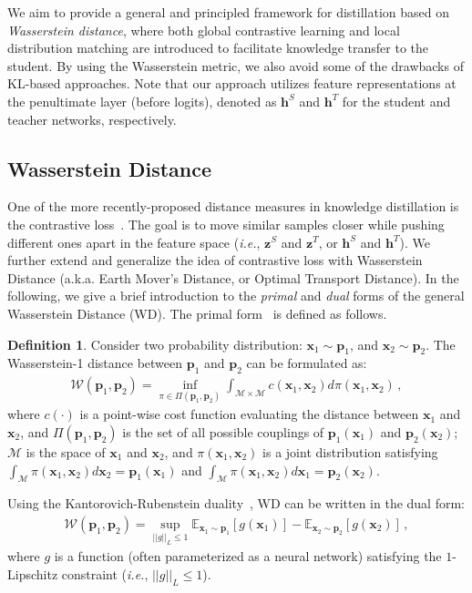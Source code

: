 \documentclass[final]{cvpr}
\newcommand{\hv}{{\boldsymbol h}}
\newcommand{\pv}{{\boldsymbol p}}
\newcommand{\xv}{{\boldsymbol x}}
\newcommand{\zv}{{\boldsymbol z}}
\newcommand{\Wcal}{\mathcal{W}}
\theoremstyle{definition}
\newtheorem{definition}{Definition}[section]
\begin{document}
We aim to provide a general and principled framework for distillation based on \emph{Wasserstein distance}, 
where both global contrastive learning and local distribution matching are introduced to facilitate  knowledge transfer to the student.
By using the Wasserstein metric, we also avoid some of the drawbacks of KL-based approaches.
Note that our approach utilizes feature representations at the penultimate layer (before logits), denoted as $\hv^S$ and $\hv^T$ for the student and teacher networks, respectively.


\subsection{Wasserstein Distance}\label{subsec:wasserstein_intro}



One of the more recently-proposed distance measures in knowledge distillation is the contrastive loss~\cite{tian2019contrastive}. The goal is to move similar samples closer while pushing different ones apart in the feature space (\emph{i.e.}, $\zv^S$ and $\zv^T$, or $\hv^S$ and $\hv^T$). We further extend and generalize the idea of contrastive loss with Wasserstein Distance (a.k.a. Earth Mover's Distance, or Optimal Transport Distance).
In the following, we give a brief introduction to the \emph{primal} and \emph{dual} forms of the general Wasserstein Distance (WD). 
The primal form~\cite{villani2008optimal} is defined as follows.
\begin{definition} \label{def:wd}
    Consider two probability distribution: $\xv_1\sim \pv_1$, and $\xv_2\sim \pv_2$.
The Wasserstein-1 distance between $\pv_1$ and $\pv_2$ can be formulated as:
\begin{align}\label{eq:wasserstein_primal}
        \Wcal(\pv_1, \pv_2) = \inf_{\pi \in \Pi(\pv_1, \pv_2)} \int_{\mathcal{M} \times \mathcal{M}} c( \xv_1, \xv_2) d\pi(\xv_1, \xv_2) \,, \nonumber
    \end{align}
where $c(\cdot)$ is a point-wise cost function evaluating the distance between $\xv_1$ and $\xv_2$, and $\Pi(\pv_1, \pv_2)$ is the set of all possible couplings of $\pv_1(\xv_1)$ and $\pv_2(\xv_2)$; $\mathcal{M}$ is the space of $\xv_1$ and $\xv_2$, and $\pi(\xv_1, \xv_2)$ is a joint distribution satisfying $\int_{\mathcal{M}}\pi(\xv_1, \xv_2)d \bm \xv_2 = \pv_1(\xv_1)$ and $\int_{\mathcal{M}}\pi(\xv_1, \xv_2)d \xv_1 = \pv_2(\xv_2)$. 
\end{definition}
Using the Kantorovich-Rubenstein duality~\cite{villani2008optimal}, WD can be written in the dual form:
\begin{align} \mathcal{W}(\pv_1, \pv_2) = \sup_{||g||_L \leq 1} \mathbb{E}_{\xv_1\sim \pv_1}\left[ g(\bm \xv_1) \right] - \mathbb{E}_{\xv_2\sim \pv_2}\left[ g(\bm \xv_2) \right]\,, \nonumber
\end{align}
where $g$ is a function (often parameterized as a neural network) satisfying the $1$-Lipschitz constraint (\emph{i.e.}, $||g||_L \leq 1$).
\end{document}
